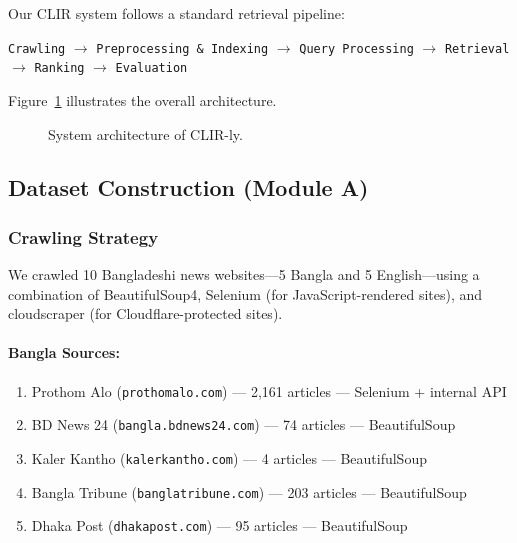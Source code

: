 \documentclass[12pt,a4paper]{article}
\begin{document}
Our CLIR system follows a standard retrieval pipeline:

\begin{center}
\texttt{Crawling} $\rightarrow$ \texttt{Preprocessing \& Indexing} $\rightarrow$ \texttt{Query Processing} $\rightarrow$ \texttt{Retrieval} $\rightarrow$ \texttt{Ranking} $\rightarrow$ \texttt{Evaluation}
\end{center}

Figure~\ref{fig:architecture} illustrates the overall architecture.

\begin{figure}[H]
    \centering
    \caption{System architecture of CLIR-ly.}
    \label{fig:architecture}
\end{figure}


\subsection{Dataset Construction (Module A)}

\subsubsection{Crawling Strategy}

We crawled 10 Bangladeshi news websites---5 Bangla and 5 English---using a combination of BeautifulSoup4, Selenium (for JavaScript-rendered sites), and cloudscraper (for Cloudflare-protected sites).

\paragraph{Bangla Sources:}
\begin{enumerate}
    \item Prothom Alo (\texttt{prothomalo.com}) --- 2{,}161 articles --- Selenium + internal API
    \item BD News 24 (\texttt{bangla.bdnews24.com}) --- 74 articles --- BeautifulSoup
    \item Kaler Kantho (\texttt{kalerkantho.com}) --- 4 articles --- BeautifulSoup
    \item Bangla Tribune (\texttt{banglatribune.com}) --- 203 articles --- BeautifulSoup
    \item Dhaka Post (\texttt{dhakapost.com}) --- 95 articles --- BeautifulSoup
\end{enumerate}
\end{document}
